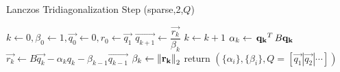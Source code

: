 \begin{frame}[plain]
	\begin{block}{}
\begin{algorithm}[H]
%
  \caption{Lanczos Tridiagonalization Step (sparse,2,$Q$)}
  \DontPrintSemicolon
%
%
%
    $k \gets 0, \beta_0 \gets 1, \vec{q_0} \gets 0, r_0 \gets \vec{q_1}$ \;
    {
      $\vec{q_{k+1}} \gets \dfrac{\vec{r_k}}{\beta_k}$ \;
      $k \gets k + 1$ \;
      $\alpha_k \gets \,{\mathbf{q_k}}^{T}\,B\mathbf{q_k}$ \;
      $\vec{r_k} \gets B\vec{q_k} - \alpha_kq_k - \beta_{k-1}\vec{q_{k-1}}$ \;
      $\beta_k \gets \left\lVert \mathbf{r_k} \right\rVert_2$ \;
    }
%
    return $(\{\alpha_i\}, \{\beta_i\}, 
             Q = [ \vec{q_1} | \vec{q_2} | \cdots ])$ \;
\end{algorithm}
\hfill
	\end{block} 
\end{frame}
